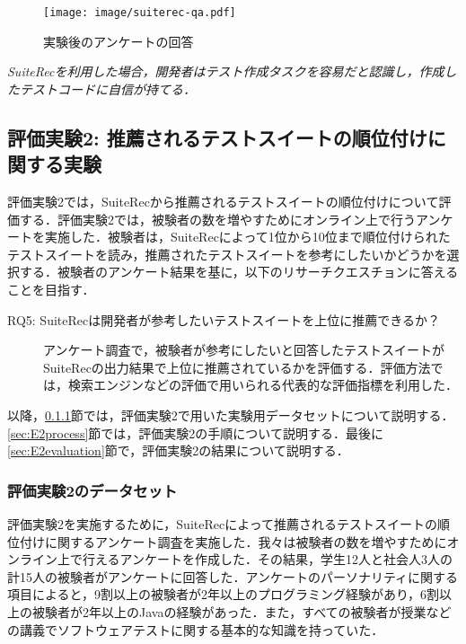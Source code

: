 \documentclass[12pt]{jarticle} %
\begin{document}
\begin{figure}[htbp]
\begin{center}
\texttt{[image: image/suiterec-qa.pdf]}
\caption{実験後のアンケートの回答}
\label{QA}
\end{center}
\end{figure}

\vspace{\baselineskip}

\begin{breakbox}
\textit{{\sf SuiteRec}を利用した場合，開発者はテスト作成タスクを容易だと認識し，作成したテストコードに自信が持てる．}
\end{breakbox}


\newpage
\subsection{評価実験2: 推薦されるテストスイートの順位付けに関する実験}
評価実験2では，{\sf SuiteRec}から推薦されるテストスイートの順位付けについて評価する．評価実験2では，被験者の数を増やすためにオンライン上で行うアンケートを実施した．被験者は，{\sf SuiteRec}によって1位から10位まで順位付けられたテストスイートを読み，推薦されたテストスイートを参考にしたいかどうかを選択する．被験者のアンケート結果を基に，以下のリサーチクエスチョンに答えることを目指す．

\begin{description}
\item[RQ5: SuiteRecは開発者が参考したいテストスイートを上位に推薦できるか？]
アンケート調査で，被験者が参考にしたいと回答したテストスイートが{\sf SuiteRec}の出力結果で上位に推薦されているかを評価する．評価方法では，検索エンジンなどの評価で用いられる代表的な評価指標を利用した．
\end{description}

以降，\ref{sec:E2data}節では，評価実験2で用いた実験用データセットについて説明する．\ref{sec:E2process}節では，評価実験2の手順について説明する．最後に\ref{sec:E2evaluation}節で，評価実験2の結果について説明する．

\subsubsection{評価実験2のデータセット}
\label{sec:E2data}

評価実験2を実施するために，{\sf SuiteRec}によって推薦されるテストスイートの順位付けに関するアンケート調査を実施した．我々は被験者の数を増やすためにオンライン上で行えるアンケートを作成した．その結果，学生12人と社会人3人の計15人の被験者がアンケートに回答した．アンケートのパーソナリティに関する項目によると，9割以上の被験者が2年以上のプログラミング経験があり，6割以上の被験者が2年以上のJavaの経験があった．また，すべての被験者が授業などの講義でソフトウェアテストに関する基本的な知識を持っていた．
\end{document}
